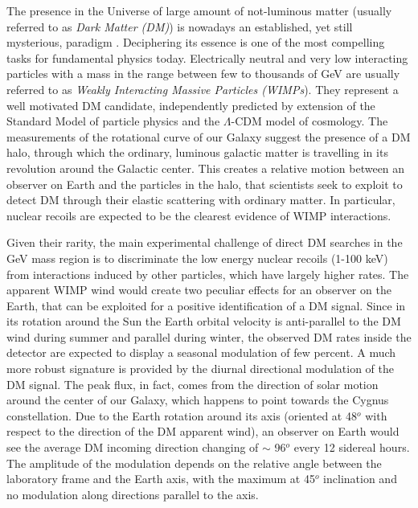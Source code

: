 \documentclass[physics,article,submit,moreauthors,pdftex]{Definitions/mdpi}
\begin{document}
The presence in the Universe of large amount of not-luminous matter (usually referred to as {\it Dark Matter (DM)}) is nowadays an established, yet still mysterious, paradigm \cite{Bertone:2004pz}. Deciphering its essence is one of the most compelling tasks for fundamental physics today. Electrically neutral and very low interacting particles with a mass in the range between few to thousands of GeV are usually referred to as {\it Weakly Interacting Massive Particles (WIMPs}). They represent a well motivated DM candidate, independently predicted by extension of the Standard Model of particle physics and the $\Lambda$-CDM model of cosmology. The measurements of the rotational curve of our Galaxy suggest the presence of a DM halo, through which the ordinary, luminous galactic matter is travelling in its revolution around the Galactic center. This creates a relative motion between an observer on Earth and the particles in the halo, that scientists seek to exploit to detect DM through their elastic scattering with ordinary matter. In particular, nuclear recoils are expected to be the clearest evidence of WIMP interactions.

Given their rarity, the main experimental challenge of direct DM searches in the GeV mass region is to discriminate the low energy nuclear recoils (1-100 keV) from interactions induced by other particles, which have largely higher rates. The apparent WIMP wind would create two peculiar effects for an observer on the Earth, that can be exploited for a positive identification of a DM signal. Since in its rotation around the Sun the Earth orbital velocity is anti-parallel to the DM wind during summer and parallel during winter, the observed DM rates inside the detector are expected to display a seasonal modulation of few percent. A much more robust signature is provided by the diurnal directional modulation of the DM signal. The peak flux, in fact, comes from the direction of solar motion around the center of our Galaxy, which happens to point towards the Cygnus constellation. Due to the Earth rotation around its axis (oriented at 48$^{o}$ with respect to the direction of the DM apparent wind), an observer on Earth would see the average DM incoming direction changing of $\sim$ 96$^{o}$ every 12 sidereal hours. The amplitude of the modulation depends on the relative angle between the laboratory frame and the Earth axis, with the maximum at 45$^{o}$ inclination and no modulation along directions parallel to the axis.
\end{document}
